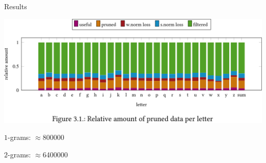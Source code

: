 \documentclass[14pt,t]{beamer}
\begin{document}
\begin{frame}[c]{Results}
    \begin{center}
        \includegraphics[width = \textwidth]{img/clean-up}
    \end{center}
    \vspace{\baselineskip}
    $1$-grams: $\approx$\num{800000}

    $2$-grams: $\approx$\num{6400000}
\end{frame}
\end{document}
